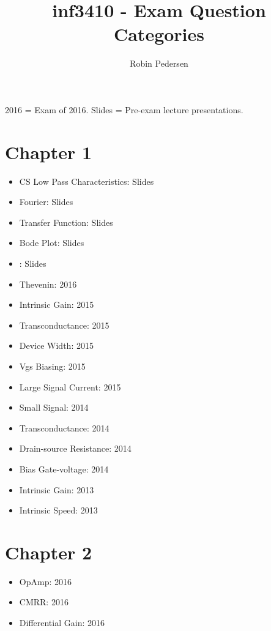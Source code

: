 \documentclass[twocolumn]{article}
\begin{document}
  \title{inf3410 - Exam Question Categories}
  \author{Robin Pedersen}
  \maketitle

  2016 = Exam of 2016.
  Slides = Pre-exam lecture presentations.

  \section*{Chapter 1}
    \begin{itemize}
      \item CS Low Pass Characteristics: Slides
      \item Fourier: Slides
      \item Transfer Function: Slides
      \item Bode Plot: Slides
      \item : Slides

      \item Thevenin: 2016

      \item Intrinsic Gain: 2015
      \item Transconductance: 2015
      \item Device Width: 2015
      \item Vgs Biasing: 2015
      \item Large Signal Current: 2015

      \item Small Signal: 2014
      \item Transconductance: 2014
      \item Drain-source Resistance: 2014
      \item Bias Gate-voltage: 2014

      \item Intrinsic Gain: 2013
      \item Intrinsic Speed: 2013
    \end{itemize}
  \section*{Chapter 2}
    \begin{itemize}
      \item OpAmp: 2016
      \item CMRR: 2016
      \item Differential Gain: 2016
    \end{itemize}
\end{document}
